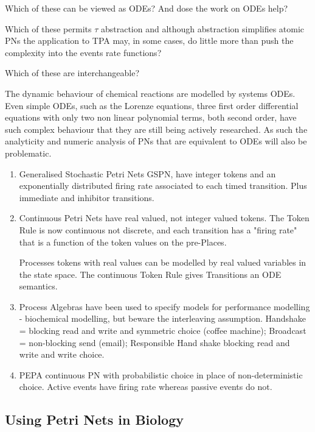Which of these can be viewed as ODEs? And dose the work on ODEs help?

Which of these permits $\tau$ abstraction and although abstraction simplifies atomic PNs the application to TPA may, in some cases, do little more than push the complexity into the events rate functions? 

Which of these are interchangeable?

The dynamic behaviour of chemical reactions are  modelled by systems ODEs. Even simple ODEs, such as the Lorenze equations, three first order differential equations with only two non linear polynomial terms, both second order, have such complex behaviour that they are still being actively researched. As such the analyticity and numeric analysis of PNs that are equivalent to ODEs will also be problematic.

\begin{enumerate}
\item Generalised Stochastic Petri Nets GSPN, have integer tokens and an exponentially distributed firing rate associated to each timed transition. Plus immediate and inhibitor transitions.

\item Continuous Petri Nets have real valued, not integer valued tokens. The Token Rule is now continuous not discrete, and each transition has a "firing rate" that is a function of the token values on the pre-Places.

 Processes tokens with real values can be modelled by real valued variables in the state space. The continuous Token Rule gives Transitions an ODE semantics.
 
 
\item Process Algebras have been used to specify models for performance modelling - biochemical modelling, but beware the interleaving assumption. Handshake = blocking read and write and symmetric choice (coffee machine); Broadcast = non-blocking send (email); Responsible Hand shake blocking read and write and write choice. 

\item  PEPA  continuous PN with probabilistic choice in place of  non-deterministic choice.  Active events have firing rate whereas passive events do not.

\end{enumerate}

\subsection{Using Petri Nets in Biology}

